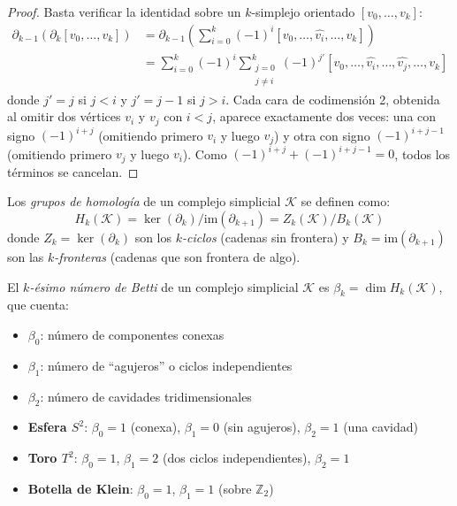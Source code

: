 \begin{proof}
	Basta verificar la identidad sobre un $k$-simplejo orientado $[v_0, \ldots, v_k]$:
	\begin{align*}
		\partial_{k-1}(\partial_k [v_0, \ldots, v_k]) &= \partial_{k-1}\!\left(\sum_{i=0}^{k} (-1)^i [v_0, \ldots, \widehat{v_i}, \ldots, v_k]\right) \\
		&= \sum_{i=0}^{k} (-1)^i \sum_{\substack{j=0 \\ j \neq i}}^{k} (-1)^{j'} [v_0, \ldots, \widehat{v_i}, \ldots, \widehat{v_j}, \ldots, v_k]
	\end{align*}
	donde $j' = j$ si $j < i$ y $j' = j-1$ si $j > i$. Cada cara de codimensión 2, obtenida al omitir dos vértices $v_i$ y $v_j$ con $i < j$, aparece exactamente dos veces: una con signo $(-1)^{i+j}$ (omitiendo primero $v_i$ y luego $v_j$) y otra con signo $(-1)^{i+j-1}$ (omitiendo primero $v_j$ y luego $v_i$). Como $(-1)^{i+j} + (-1)^{i+j-1} = 0$, todos los términos se cancelan.
\end{proof}

\begin{definition}\label{def:homologia_betti}
	Los \textit{grupos de homología} de un complejo simplicial $\mathcal{K}$ se definen como:
	\[
		H_k(\mathcal{K}) = \ker(\partial_k) / \mathrm{im}(\partial_{k+1}) = Z_k(\mathcal{K}) / B_k(\mathcal{K})
	\]
	donde $Z_k = \ker(\partial_k)$ son los \textit{$k$-ciclos} (cadenas sin frontera) y $B_k = \mathrm{im}(\partial_{k+1})$ son las \textit{$k$-fronteras} (cadenas que son frontera de algo).
\end{definition}

\begin{definition}\label{def:numeros_betti_gdl}
	El \textit{$k$-ésimo número de Betti} de un complejo simplicial $\mathcal{K}$ es $\beta_k = \dim H_k(\mathcal{K})$, que cuenta:
	\begin{itemize}
		\item $\beta_0$: número de componentes conexas
		\item $\beta_1$: número de ``agujeros'' o ciclos independientes
		\item $\beta_2$: número de cavidades tridimensionales
	\end{itemize}
\end{definition}

\begin{example}\label{ex:betti_superficies}
\leavevmode
	\begin{itemize}
		\item \textbf{Esfera $S^2$}: $\beta_0 = 1$ (conexa), $\beta_1 = 0$ (sin agujeros), $\beta_2 = 1$ (una cavidad)
		\item \textbf{Toro $T^2$}: $\beta_0 = 1$, $\beta_1 = 2$ (dos ciclos independientes), $\beta_2 = 1$
		\item \textbf{Botella de Klein}: $\beta_0 = 1$, $\beta_1 = 1$ (sobre $\mathbb{Z}_2$)
	\end{itemize}
\end{example}

